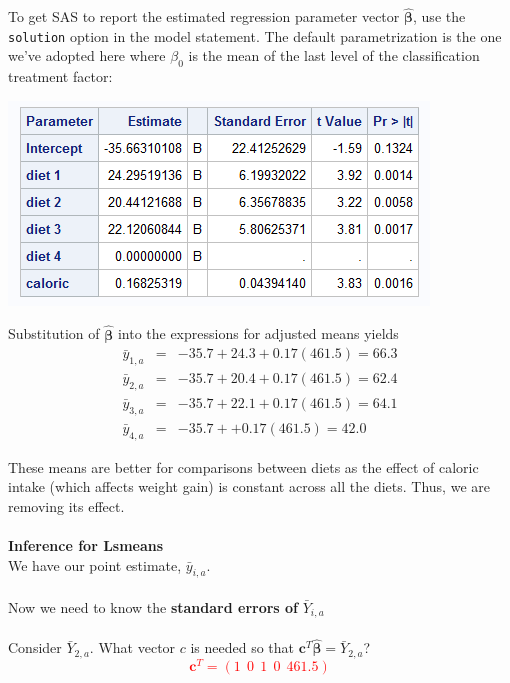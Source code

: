 To get SAS to report the estimated regression parameter vector $\hat{\boldsymbol{\beta}}$, use the {\tt solution} option in the model statement.  The default parametrization is the one we've adopted here where $\beta_0$ is the mean of the last level of the classification treatment factor:

\begin{center}
\includegraphics{DietsEstimates}
\end{center}

Substitution of $\hat{\boldsymbol{\beta}}$ into the expressions for adjusted means yields
\begin{eqnarray*}
\bar{y}_{1,a} & = & -35.7 + 24.3 + 0.17 (461.5) = 66.3\\
\bar{y}_{2,a} & = & -35.7 + 20.4 + 0.17 (461.5) = 62.4 \\
\bar{y}_{3,a} & = & -35.7 + 22.1 + 0.17 (461.5) = 64.1 \\
\bar{y}_{4,a} & = & -35.7 + + 0.17 (461.5) = 42.0 
\end{eqnarray*} 

These means are better for comparisons between diets as the effect of caloric intake (which affects weight gain) is constant across all the diets.  Thus, we are removing its effect.\\~\\

\newpage
\Large\textbf{Inference for Lsmeans}\large\\
We have our point estimate, $\bar{y}_{i,a}$.\\~\\
Now we need to know the \textbf{standard errors of }$\bar{Y}_{i,a}$\\~\\

Consider $\bar{Y}_{2,a}$.  What vector $c$ is needed so that $\textbf{c}^{T}\hat{\boldsymbol{\beta}} = \bar{Y}_{2,a}$?%
\textcolor{red}{$$\textbf{c}^{T}=(1~~0~~1~~0~~461.5)$$~\\}

